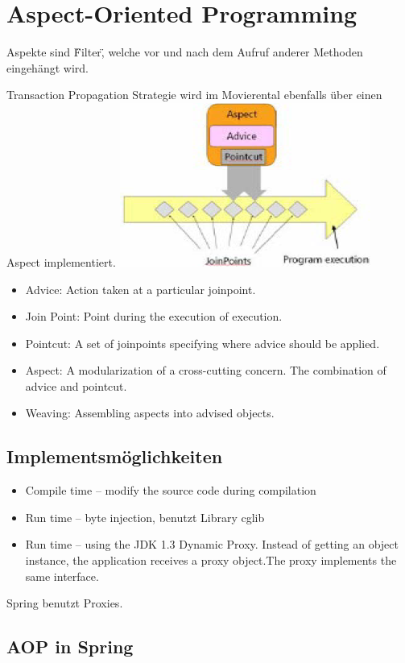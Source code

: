 \documentclass[10pt]{scrartcl}
\begin{document}
\newpage
\section{Aspect-Oriented Programming}
Aspekte sind \"Filter\", welche vor und nach dem Aufruf anderer Methoden eingehängt wird.

Transaction Propagation Strategie wird im Movierental ebenfalls über einen Aspect implementiert.\newline
\includegraphics[scale=1.0]{aopterminology.png}\\
\begin{itemize}
	\item Advice: Action taken at a particular joinpoint.
	\item Join Point: Point during the execution of execution.
	\item Pointcut: A set of joinpoints specifying where advice should be applied.
	\item Aspect: A modularization of a cross-cutting concern. The combination of advice and pointcut.
	\item Weaving: Assembling aspects into advised objects.
\end{itemize}

\subsection{Implementsmöglichkeiten}
\begin{itemize}
	\item Compile time – modify the source code during compilation
	\item Run time – byte injection, benutzt Library cglib
	\item Run time – using the JDK 1.3 Dynamic Proxy. Instead of getting an object instance, the application receives a proxy object.The proxy implements the same interface.
\end{itemize}
Spring benutzt Proxies.

\subsection{AOP in Spring}


\end{document}
